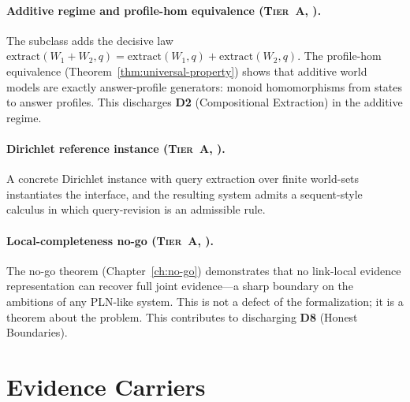 \paragraph{Additive regime and profile-hom equivalence
  (\textsc{Tier~A}, \claimCore{}).}
The  subclass adds the decisive law
$\mathrm{extract}(W_1 + W_2, q) = \mathrm{extract}(W_1, q) +
\mathrm{extract}(W_2, q)$.  The profile-hom equivalence
(Theorem~\ref{thm:universal-property}) shows that additive world models
are exactly answer-profile generators: monoid homomorphisms from states
to answer profiles.  This discharges \textbf{D2} (Compositional
Extraction) in the additive regime.

\paragraph{Dirichlet reference instance (\textsc{Tier~A}, \claimCore{}).}
A concrete Dirichlet instance with query extraction over finite
world-sets instantiates the interface, and the resulting system admits a
sequent-style calculus in which query-revision is an admissible rule.

\paragraph{Local-completeness no-go
  (\textsc{Tier~A}, \claimBoundary{}).}
The no-go theorem (Chapter~\ref{ch:no-go}) demonstrates that no
link-local evidence representation can recover full joint evidence---a
sharp boundary on the ambitions of any PLN-like system.  This is not a
defect of the formalization; it is a theorem about the problem.  This
contributes to discharging \textbf{D8} (Honest Boundaries).



\section{Evidence Carriers}
\label{sec:covers-carriers}

